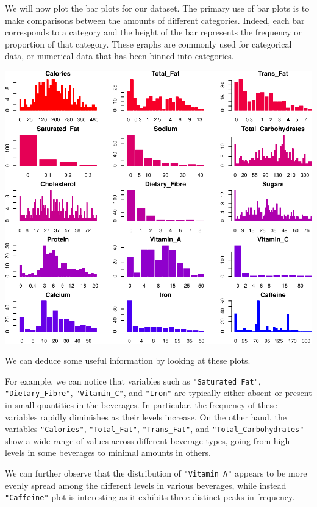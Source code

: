 \documentclass[
]{article}
\begin{document}
We will now plot the bar plots for our dataset. The primary use of bar
plots is to make comparisons between the amounts of different
categories. Indeed, each bar corresponds to a category and the height of
the bar represents the frequency or proportion of that category. These
graphs are commonly used for categorical data, or numerical data that
has been binned into categories.

\begin{center}\includegraphics{Statistical_Learning_Final_Report_files/figure-latex/barplot-1} \end{center}

We can deduce some useful information by looking at these plots.

For example, we can notice that variables such as
\texttt{"Saturated\_Fat"}, \texttt{"Dietary\_Fibre"},
\texttt{"Vitamin\_C"}, and \texttt{"Iron"} are typically either absent
or present in small quantities in the beverages. In particular, the
frequency of these variables rapidly diminishes as their levels
increase. On the other hand, the variables \texttt{"Calories"},
\texttt{"Total\_Fat"}, \texttt{"Trans\_Fat"}, and
\texttt{"Total\_Carbohydrates"} show a wide range of values across
different beverage types, going from high levels in some beverages to
minimal amounts in others.

We can further observe that the distribution of \texttt{"Vitamin\_A"}
appears to be more evenly spread among the different levels in various
beverages, while instead \texttt{"Caffeine"} plot is interesting as it
exhibits three distinct peaks in frequency.
\end{document}
